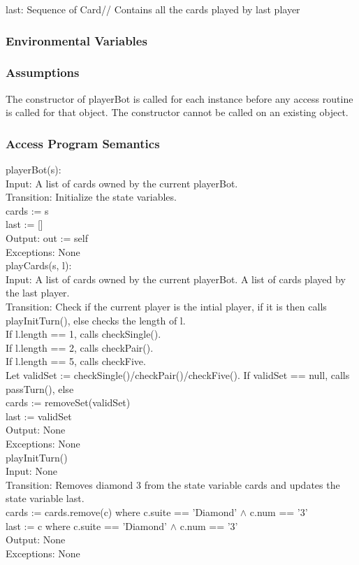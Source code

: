 \documentclass[12pt, titlepage]{article}
\begin{document}
\noindent last: Sequence of Card// Contains all the cards played by last player
\subsubsection{Environmental Variables}

\subsubsection{Assumptions}
The constructor of playerBot is called for each instance before any access routine is called for that object. The constructor cannot be called on an existing object.
\subsubsection{Access Program Semantics} 

playerBot(s): \\
Input: A list of cards owned by the current playerBot.\\
Transition: Initialize the state variables. \\
cards := s\\
last := []\\
Output: out := self\\
Exceptions: None \\ 

\noindent playCards(s, l):\\
Input: A list of cards owned by the current playerBot. A list of cards played by the last player.\\
Transition: Check if the current player is the intial player, if it is then calls playInitTurn(), else checks the length of l.\\
If l.length == 1, calls checkSingle().\\
If l.length == 2, calls checkPair().\\
If l.length == 5, calls checkFive.\\
Let validSet := checkSingle()/checkPair()/checkFive().
If validSet == null, calls passTurn(), else\\
cards := removeSet(validSet)\\
last := validSet\\
Output: None \\
Exceptions: None \\

\noindent playInitTurn()\\
Input: None\\
Transition: Removes diamond 3 from the state variable cards and updates the state variable last.\\
cards := cards.remove(c) where c.suite == 'Diamond' $\land$ c.num == '3'\\
last := c where c.suite == 'Diamond' $\land$ c.num == '3'\\
Output: None\\
Exceptions: None \\
\end{document}
